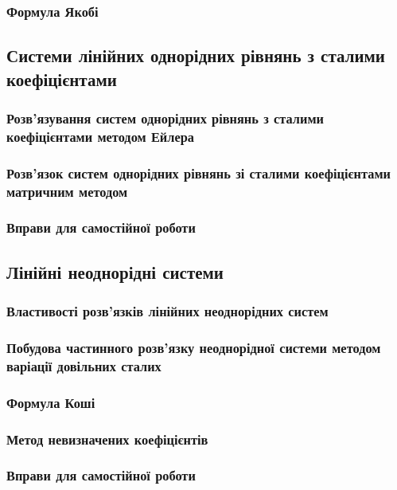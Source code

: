		\subsubsection{Формула Якобі}
		

	\subsection{Системи лінійних однорідних рівнянь з сталими коефіцієнтами}
	

		\subsubsection{Розв'язування систем однорідних рівнянь з сталими коефіцієнтами методом Ейлера}
		

		\subsubsection{Розв'язок систем однорідних рівнянь зі сталими коефіцієнтами матричним методом}
		

		\subsubsection{Вправи для самостійної роботи}
		

	\subsection{Лінійні неоднорідні системи}
	

		\subsubsection{Властивості розв'язків лінійних неоднорідних систем}
		

		\subsubsection{Побудова частинного розв'язку неоднорідної системи методом варіації довільних сталих}
		

		\subsubsection{Формула Коші}
		

		\subsubsection{Метод невизначених коефіцієнтів}
		

		\subsubsection{Вправи для самостійної роботи}

\newpage

\nocite{*}





